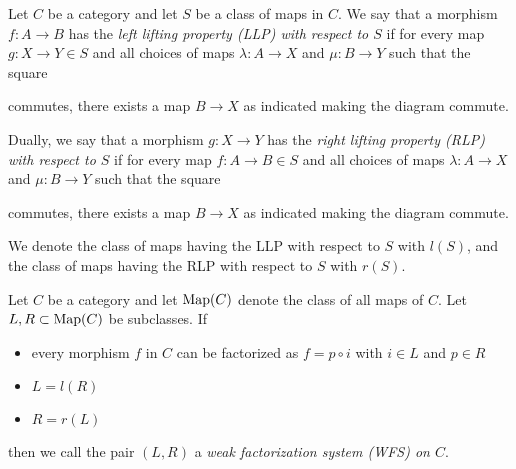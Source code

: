 \begin{definition}
    Let $C$ be a category and let $S$ be a class of maps in $C$.
    We say that a morphism $f\colon A\to B$ has the \emph{left lifting property (LLP) with respect to $S$} if for every map $g\colon X\to Y\in S$ and all choices of maps $\lambda\colon A\to X$ and $\mu\colon B\to Y$ such that the square
    \begin{center}
    \end{center}
    commutes, there exists a map $B\to X$ as indicated making the diagram commute.

    Dually, we say that a morphism $g\colon X\to Y$ has the \emph{right lifting property (RLP) with respect to $S$} if for every map $f\colon A\to B\in S$ and all choices of maps $\lambda\colon A\to X$ and $\mu\colon B\to Y$ such that the square
    \begin{center}
    \end{center}
    commutes, there exists a map $B\to X$ as indicated making the diagram commute.

    We denote the class of maps having the LLP with respect to $S$ with $l(S)$, and the class of maps having the RLP with respect to $S$ with $r(S)$.
\end{definition}
\begin{definition}
    Let $C$ be a category and let $\operatorname{Map}(C)$ denote the class of all maps of $C$.
    Let $L,R\subset\operatorname{Map}(C)$ be subclasses.
    If 
    \begin{itemize}
        \item every morphism $f$ in $C$ can be factorized as $f=p\circ i$ with $i\in L$ and $p\in R$
        \item $L=l(R)$
        \item $R=r(L)$
    \end{itemize}
    then we call the pair $(L,R)$ a \emph{weak factorization system (WFS) on $C$}.
\end{definition}

